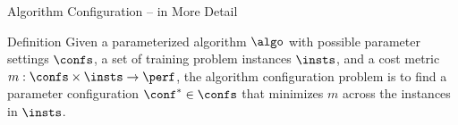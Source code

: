 \begin{frame}[c]{Algorithm Configuration -- in More Detail}

\bigskip

\centering
\scalebox{0.75}{
	
}

\bigskip

\begin{block}{Definition}
	Given a parameterized algorithm $\algo$ with possible parameter settings $\confs$, \pause 
	a set of training problem instances $\insts$, \pause 
	and a cost metric $m: \confs \times \insts \rightarrow \perf$, \pause 
	the algorithm configuration problem is 
	to \alert{find a parameter configuration $\conf^* \in \confs$ 
		that minimizes $m$ across the instances in $\insts$}.
\end{block}

\end{frame}


